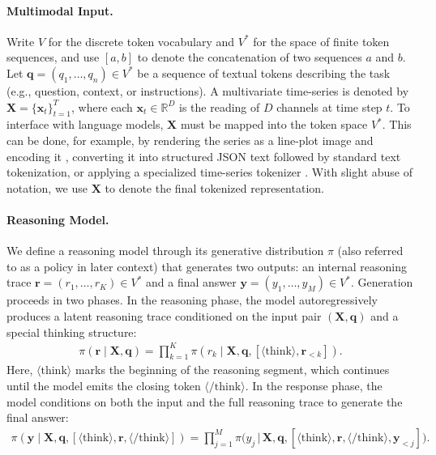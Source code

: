 \documentclass[twoside]{article}
\begin{document}
\paragraph{Multimodal Input.}  
Write \(V\) for the discrete token vocabulary and \(V^{*}\) for the space of finite token sequences, and use \([a,b]\) to denote the concatenation of two sequences \(a\) and \(b\). Let \(\mathbf{q}=(q_1,\ldots,q_{n}) \in V^{*}\) be a sequence of textual tokens describing the task (e.g., question, context, or instructions).   
A multivariate time-series is denoted by \(\mathbf{X}=\{\mathbf{x}_t\}_{t=1}^{T}\), where each \(\mathbf{x}_t \in \mathbb{R}^{D}\) is the reading of \(D\) channels at time step \(t\). To interface with language models, \(\mathbf{X}\) must be mapped into the token space \(V^{*}\). This can be done, for example, by rendering the series as a line-plot image and encoding it \citep{liu2025picture}, converting it into structured JSON text followed by standard text tokenization, or applying a specialized time-series tokenizer \citep{xie2024chatts}. With slight abuse of notation, we use \(\mathbf{X}\) to denote the final tokenized representation.

\paragraph{Reasoning Model.} 
We define a reasoning model through its generative distribution \(\pi\) (also referred to as a policy in later context) that generates two outputs: an internal reasoning trace \(\mathbf{r}=(r_1,\ldots,r_K)\in V^{*}\) and a final answer \(\mathbf{y}=(y_1,\ldots,y_M)\in V^{*}\). Generation proceeds in two phases. In the reasoning phase, the model autoregressively produces a latent reasoning trace conditioned on the input pair \((\mathbf{X},\mathbf{q})\) and a special thinking structure:
\begin{align}
\pi(\mathbf{r}\mid \mathbf{X},\mathbf{q})
= \prod_{k=1}^{K}
\pi\!\left(r_k \mid  \mathbf{X}, \mathbf{q}, [\langle\mathrm{think}\rangle, \mathbf{r}_{<k}]\right).
\end{align}
Here, \(\langle\mathrm{think}\rangle\) marks the beginning of the reasoning segment, which continues until the model emits the closing token \(\langle/\mathrm{think}\rangle\). In the response phase, the model conditions on both the input and the full reasoning trace to generate the final answer:
\begin{align}
\label{eq:answer_generation}
\pi(\mathbf{y}\mid \mathbf{X},\mathbf{q},[\langle\mathrm{think}\rangle, \mathbf{r},\langle\mathrm{/think}\rangle]) = \prod_{j=1}^{M} \pi\Big(
y_j \,\Big|\, \mathbf{X}, \mathbf{q}, [\langle\mathrm{think}\rangle,\mathbf{r}, \langle/\mathrm{think}\rangle,\mathbf{y}_{<j}]\Big).
\end{align}
\end{document}
